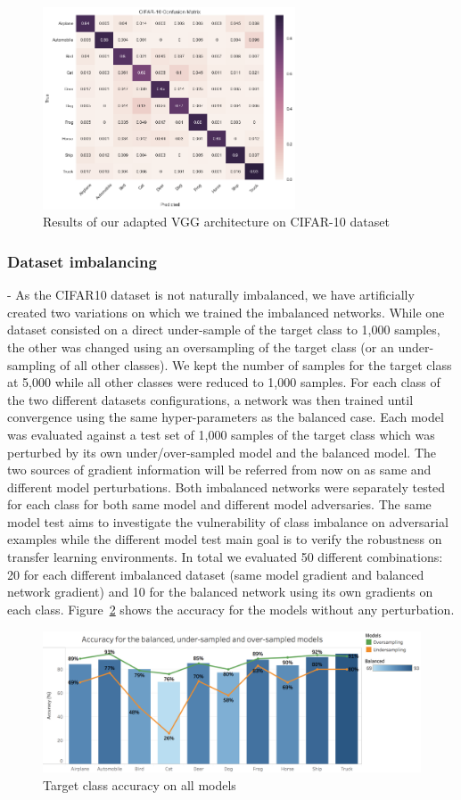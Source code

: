 \documentclass[runningheads,a4paper]{llncs}
\begin{document}
\begin{figure}
	\centering
	\includegraphics[height=6.0cm]{conf_matrix.png}
	\caption{Results of our adapted VGG architecture on CIFAR-10 dataset}
	\label{fig:conf_matrix_full}
\end{figure}

\subsubsection{Dataset imbalancing} - As the CIFAR10 dataset is not naturally imbalanced, we have artificially created two variations on which we trained the imbalanced networks.  While one dataset consisted on a direct under-sample of the target class to 1,000 samples, the other was changed using  an oversampling of the target class (or an under-sampling of all other classes). We kept the number of samples for the target class at 5,000 while all other classes were reduced to 1,000 samples. For each class of the two different datasets configurations, a network was then trained until convergence using the same hyper-parameters as the balanced case. Each model was evaluated against a test set of 1,000 samples of the target class which was  perturbed by its own under/over-sampled model and the balanced model. The two sources of gradient information will be referred from now on as same and different model perturbations. Both imbalanced networks were separately tested for each class for both same model and different model adversaries. The same model test aims to investigate the vulnerability of class imbalance on adversarial examples while the different model test main goal is to verify the robustness on transfer learning environments. In total we evaluated 50 different combinations: 20 for each different imbalanced dataset (same model gradient and balanced network gradient) and 10 for the balanced network using its own gradients on each class. Figure~\ref{fig:acc_graph} shows the accuracy for the models without any perturbation.
\begin{figure}
	\centering
	\includegraphics[height=4.2cm]{graph_non_pert.png}
	\caption{Target class accuracy on all models}
	\label{fig:acc_graph}
\end{figure}
\end{document}
